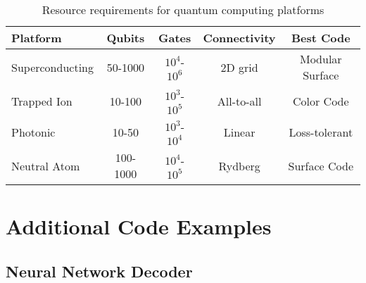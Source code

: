\documentclass[12pt,a4paper]{article}
\begin{document}
\begin{table}[h]
\centering
\begin{tabular}{|l|c|c|c|c|}
\hline
\textbf{Platform} & \textbf{Qubits} & \textbf{Gates} & \textbf{Connectivity} & \textbf{Best Code} \\
\hline
Superconducting & 50-1000 & $10^4$-$10^6$ & 2D grid & Modular Surface \\
Trapped Ion & 10-100 & $10^3$-$10^5$ & All-to-all & Color Code \\
Photonic & 10-50 & $10^3$-$10^4$ & Linear & Loss-tolerant \\
Neutral Atom & 100-1000 & $10^4$-$10^5$ & Rydberg & Surface Code \\
\hline
\end{tabular}
\caption{Resource requirements for quantum computing platforms}
\end{table}

\section{Additional Code Examples}

\subsection{Neural Network Decoder}
\end{document}
